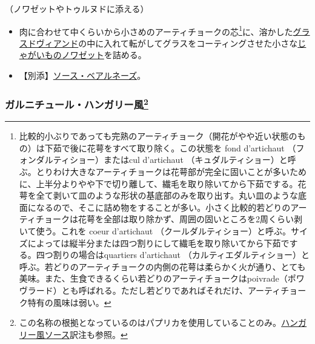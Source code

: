 \begin{recette}
（ノワゼットやトゥルヌドに添える）

\begin{itemize}
\item
  肉に合わせて中くらいから小さめのアーティチョークの芯\footnote{比較的小ぶりであっても完熟のアーティチョーク（開花がやや近い状態のもの）は下茹で後に花萼をすべて取り除く。この状態を
    fond d'artichaut （フォンダルティショー）またはcul d'artichaut
    （キュダルティショー）と呼ぶ。とりわけ大きなアーティチョークは花萼部が完全に固いことが多いために、上半分よりやや下で切り離して、繊毛を取り除いてから下茹でする。花萼を全て剥いて皿のような形状の基底部のみを取り出す。丸い皿のような底面になるので、そこに詰め物をすることが多い。小さく比較的若どりのアーティチョークは花萼を全部は取り除かず、周囲の固いところを2周くらい剥いて使う。これを
    coeur d'artichaut
    （クールダルティショー）と呼ぶ。サイズによっては縦半分または四つ割りにして繊毛を取り除いてから下茹でする。四つ割りの場合はquartiers
    d'artichaut
    （カルティエダルティショー）と呼ぶ。若どりのアーティチョークの内側の花萼は柔らかく火が通り、とても美味。また、生食できるくらい若どりのアーティチョークはpoivrade（ポワヴラード）とも呼ばれる。ただし若どりであればそれだけ、アーティチョーク特有の風味は弱い。}に、溶かした\protect\hyperlink{glace-de-viande}{グラスドヴィアンド}の中に入れて転がしてグラスをコーティングさせた小さな\protect\hyperlink{pommes-de-terre-noisette}{じゃがいものノワゼット}を詰める。
\item
  【別添】\protect\hyperlink{sauce-bearnaise}{ソース・ベアルネーズ}。
\end{itemize}

\atoaki{}

\hypertarget{garniture-a-la-hongroise}{%
\subsubsection[ガルニチュール・ハンガリー風]{\texorpdfstring{ガルニチュール・ハンガリー風\footnote{この名称の根拠となっているのはパプリカを使用していることのみ。\protect\hyperlink{sauce-hongroise}{ハンガリー風ソース}訳注も参照。}}{ガルニチュール・ハンガリー風}}\label{garniture-a-la-hongroise}}




\end{recette}

